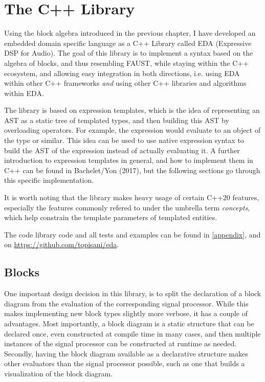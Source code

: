 \chapter{The C++ Library}
\label{chap:cpp_lib}

Using the block algebra introduced in the previous chapter, I have developed an embedded domain specific
language as a C++ Library called EDA (Expressive DSP for Audio). The goal of this library is to implement a
syntax based on the algebra of blocks, and thus resembling FAUST, while staying within the C++ ecosystem, and
allowing easy integration in both directions, i.e. using EDA within other C++ frameworks
\emph{and} using other C++ libraries and algorithms within EDA.

The library is based on expression templates\autocite{bachelet}, which is the idea of representing an AST
as a static tree of templated types, and then building this AST by overloading operators. For example, the
expression
 would evaluate to an object of the type  or similar. This idea can
be used to use native expression syntax to build the AST of the expression instead of actually evaluating it.
A further introduction to expression templates in general, and how to implement them in C++ can be found in
Bachelet/Yon (2017)\autocite{bachelet}, but the following sections go through this specific
implementation.

It is worth noting that the library makes heavy usage of certain C++20\autocite{C++Std} features,
especially the features commonly refered to under the umbrella term
\emph{concepts}\autocite{cppr:concepts}, which help constrain the template parameters of templated
entities.

The code library code and all tests and examples can be found in \autoref{appendix}, and on
\url{https://github.com/topisani/eda}.

\section{Blocks}

One important design decision in this library, is to split the declaration of a block diagram from the
evaluation of the corresponding signal processor. While this makes implementing new block types slightly more
verbose, it has a couple of advantages. Most importantly, a block diagram is a static structure that can be
declared once, even constructed at compile time in many cases, and then multiple instances of the signal
processor can be constructed at runtime as needed. Secondly, having the block diagram available as a
declarative structure makes other evaluators than the signal processor possible, such as one that builds a
visualization of the block diagram.

